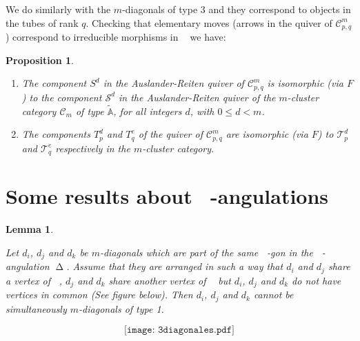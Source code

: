 \documentclass{amsart}
\theoremstyle{plain}
\newtheorem{lema}[teo]{Lemma}
\newtheorem{prop}[teo]{Proposition}
\theoremstyle{definition}
\begin{document}
We do similarly with the $m$-diagonals of type 3 and they correspond to objects in the tubes of rank $q$. Checking that elementary moves (arrows in the quiver of  $\mathcal{C}^m_{p,q}$ ) correspond to irreducible morphisms in ${\mathop{\mathcal{C}_m}\nolimits}$ we have:

\begin{prop}\textnormal{\cite{T12-arxiv} }

\begin{enumerate}
\item The component $S^d$  in the Auslander-Reiten quiver of  $\mathcal{C}^m_{p,q}$ is isomorphic (via $F$) to the component $\mathcal{S}^d$ in the Auslander-Reiten quiver of the
$m$-cluster category $\mathcal{C}_m$ of type $\widetilde{\mathbb{A}}$,
for all integers $d$, with $0 \leq d < m$.
\item The components $T^d_p$ and $T^e_q$ of the quiver of   $\mathcal{C}^m_{p,q}$
are isomorphic (via $F$) to $\mathcal{T}^d_p$ and $\mathcal{T}^e_q$ respectively
in the  $m$-cluster category.

\end{enumerate}

\end{prop}

\section{Some results about  ${\mathop{(m+2)}\nolimits}$-angulations}

\begin{lema}\label{las 3 diag no pueden ser de tipo 1}

 Let $d_i$, $d_j$ and $d_k$ be    $m$-diagonals which are part of the same   ${\mathop{(m+2)}\nolimits}$-gon in the ${\mathop{(m+2)}\nolimits}$-angulation ${\mathop{\Delta}\nolimits}$. Assume that they are arranged in such  a way that  $d_i$ and $d_j$ share a vertex of ${\mathop{P_{p,q,m}}\nolimits}$, $d_j$ and $d_k$ share another vertex of  ${\mathop{P_{p,q,m}}\nolimits}$ but $d_i$, $d_j$ and $d_k$ do not have vertices in common (See figure below). Then $d_i$, $d_j$ and $d_k$  cannot be simultaneously  $m$-diagonals of type 1.

\end{lema}

\vspace*{-.9cm}
\begin{figure}[H]
\begin{center}
$$\texttt{[image: 3diagonales.pdf]}$$
\end{center}
\end{figure}
\end{document}
